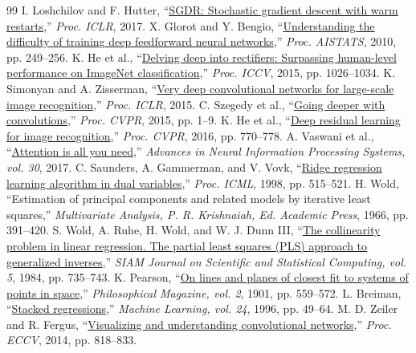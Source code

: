 \begin{thebibliography}{99}
 I. Loshchilov and F. Hutter, ``\href{https://arxiv.org/abs/1608.03983}{SGDR: Stochastic gradient descent with warm restarts},'' \emph{Proc. ICLR}, 2017.
 X. Glorot and Y. Bengio, ``\href{https://proceedings.mlr.press/v9/glorot10a.html}{Understanding the difficulty of training deep feedforward neural networks},'' \emph{Proc. AISTATS}, 2010, pp. 249--256.
 K. He et al., ``\href{https://openaccess.thecvf.com/content_iccv_2015/html/He_Delving_Deep_into_ICCV_2015_paper.html}{Delving deep into rectifiers: Surpassing human-level performance on ImageNet classification},'' \emph{Proc. ICCV}, 2015, pp. 1026--1034.
 K. Simonyan and A. Zisserman, ``\href{https://arxiv.org/abs/1409.1556}{Very deep convolutional networks for large-scale image recognition},'' \emph{Proc. ICLR}, 2015.
 C. Szegedy et al., ``\href{https://openaccess.thecvf.com/content_cvpr_2015/html/Szegedy_Going_Deeper_With_2015_CVPR_paper.html}{Going deeper with convolutions},'' \emph{Proc. CVPR}, 2015, pp. 1--9.
 K. He et al., ``\href{https://openaccess.thecvf.com/content_cvpr_2016/html/He_Deep_Residual_Learning_2016_CVPR_paper.html}{Deep residual learning for image recognition},'' \emph{Proc. CVPR}, 2016, pp. 770--778.
 A. Vaswani et al., ``\href{https://papers.nips.cc/paper_files/paper/2017/hash/3f5ee243547dee91fbd053c1c4a845aa-Abstract.html}{Attention is all you need},'' \emph{Advances in Neural Information Processing Systems, vol. 30}, 2017.
 C. Saunders, A. Gammerman, and V. Vovk, ``\href{https://eprints.soton.ac.uk/258942/}{Ridge regression learning algorithm in dual variables},'' \emph{Proc. ICML}, 1998, pp. 515--521.
 H. Wold, ``Estimation of principal components and related models by iterative least squares,'' \emph{Multivariate Analysis, P. R. Krishnaiah, Ed. Academic Press}, 1966, pp. 391--420.
 S. Wold, A. Ruhe, H. Wold, and W. J. Dunn III, ``\href{https://doi.org/10.1137/0905052}{The collinearity problem in linear regression. The partial least squares (PLS) approach to generalized inverses},'' \emph{SIAM Journal on Scientific and Statistical Computing, vol. 5}, 1984, pp. 735--743.
 K. Pearson, ``\href{https://doi.org/10.1080/14786440109462720}{On lines and planes of closest fit to systems of points in space},'' \emph{Philosophical Magazine, vol. 2}, 1901, pp. 559--572.
 L. Breiman, ``\href{https://doi.org/10.1007/BF00117832}{Stacked regressions},'' \emph{Machine Learning, vol. 24}, 1996, pp. 49--64.
 M. D. Zeiler and R. Fergus, ``\href{https://arxiv.org/abs/1311.2901}{Visualizing and understanding convolutional networks},'' \emph{Proc. ECCV}, 2014, pp. 818--833.
\end{thebibliography}
